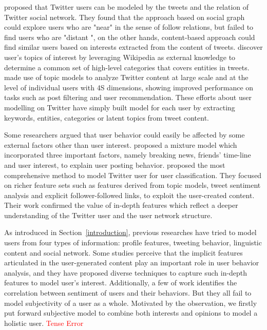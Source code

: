 \documentclass{acm_proc_article-sp}
\newcommand{\mo}[1]{\textcolor{red}{#1}}
\begin{document}
\cite{Hannon:2010} proposed that Twitter users can be modeled by the tweets and the relation of Twitter social network.
They found that the approach based on social graph could explore users who are "near" in the sense of follow relations, but failed to find users who are "distant ", on the other hands, content-based approach could find similar users based on interests extracted from the content of tweets. 
\cite{conf/icwsm/MacskassyM11} discover user's topics of interest by leveraging Wikipedia as external knowledge to determine a common set of high-level categories that covers entities in tweets. 
\cite{RamageEtAl:10} made use of topic models to analyze Twitter content at large scale and at the level of individual users with 4S dimensions, showing improved performance on tasks such as post filtering and user recommendation. 
These efforts about user modelling on Twitter have simply built model for each user by extracting keywords, entities, categories or latent topics from tweet content. 

Some researchers argued that user behavior could easily be affected by some external factors other than user interest.
\cite{Xu:2012MUP} proposed a mixture model which incorporated three important factors, namely breaking news, friends' time-line and user interest, to explain user posting behavior.
\cite{Pennacchiotti:icwsm11} proposed the most comprehensive method to model Twitter user for user classification. They focused on richer feature sets such as features derived from topic models, tweet sentiment analysis and explicit follower-followed links, to exploit the user-created content. 
Their work confirmed the value of in-depth features which reflect a deeper understanding of the Twitter user and the user network structure.

As introduced in Section~\ref{introduction}, previous researches have tried to model users from four types of information: profile features, tweeting behavior, linguistic content and social network. 
Some studies perceive that the implicit features articulated in the user-generated content play an important role in user behavior analysis,  and they have proposed diverse techniques to capture such in-depth features to model user's interest. 
Additionally, a few of work identifies the correlation between sentiment of users and their behaviors.
But they all fail to model subjectivity of a user as a whole.
Motivated by the observation, we firstly put forward subjective model to combine both interests and opinions to model a holistic user. \mo{Tense Error}
\end{document}
